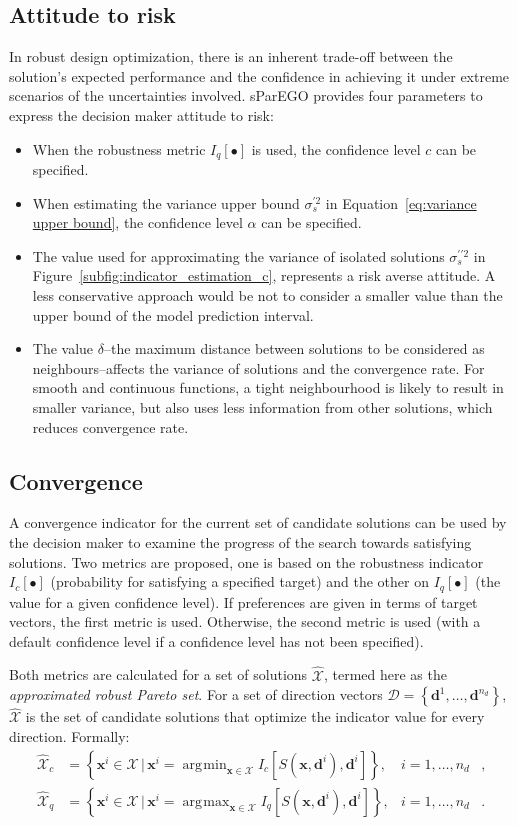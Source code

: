 \documentclass[10pt]{llncs}
\newcommand{\brr}[1]{{\left({#1}\right)}} %
\newcommand{\brf}[1]{\left\lbrace{#1}\right\rbrace} %
\newcommand{\Iq}[1]{\ensuremath{I_q\!\left[{#1}\right]}} %
\newcommand{\Ic}[1]{\ensuremath{I_c\!\left[{#1}\right]}} %
\newcommand{\vx}{\ensuremath{\mathbf{x}}} %
\newcommand{\vd}{\ensuremath{\mathbf{d}}} %
\newcommand{\DSet}{\ensuremath{\mathcal{D}}} %
\newcommand{\XSet}{\ensuremath{\mathcal{X}}} %
\DeclareMathOperator*{\argmin}{\arg\!\min}
\DeclareMathOperator*{\argmax}{\arg\!\max}
\begin{document}
\subsection{Attitude to risk}
\label{subsec:risk}
In robust design optimization, there is an inherent trade-off between the solution's expected performance and the confidence in achieving it under extreme scenarios of the uncertainties involved. sParEGO provides four parameters to express the decision maker attitude to risk:
\begin{itemize}
	\item When the robustness metric $\Iq{\bullet}$ is used, the confidence level $c$ can be specified.
	\item When estimating the variance upper bound $\sigma^{\prime 2}_s$  in Equation~\eqref{eq:variance upper bound}, the confidence level $\alpha$ can be specified.
	\item The value used for approximating the variance of isolated solutions $\sigma^{\prime\prime 2}_s$ in Figure~\ref{subfig:indicator_estimation_c}, represents a risk averse attitude. A less conservative approach would be not to consider a smaller value than the upper bound of the model prediction interval.
	\item The value $\delta$--the maximum distance between solutions to be considered as neighbours--affects the variance of solutions and the convergence rate.
		For smooth and continuous functions, a tight neighbourhood is likely to result in smaller variance, but also uses less information from other solutions, which reduces convergence rate.
\end{itemize}

\subsection{Convergence}
\label{subsec:convergence}
A convergence indicator for the current set of candidate solutions can be used by the decision maker to examine the progress of the search towards satisfying solutions. Two metrics are proposed, one is based on the robustness indicator $\Ic{\bullet}$ (probability for satisfying a specified target) and the other on $\Iq{\bullet}$ (the value for a given confidence level). If preferences are given in terms of target vectors, the first metric is used. Otherwise, the second metric is used (with a default confidence level if a confidence level has not been specified).

Both metrics are calculated for a set of solutions $\hat{\XSet}$, termed here as the \textit{approximated robust Pareto set}. For a set of direction vectors $\DSet = \brf{\vd^1,\ldots,\vd^{n_d}}$, $\hat{\XSet}$ is the set of candidate solutions that optimize the indicator value for every direction. Formally:
\begin{align}
	\label{eq:Xc} \hat{\XSet}_c &= \brf{\vx^i\in \XSet \,\vert\, \vx^i = \argmin_{\vx\in\XSet} \Ic{S\brr{\vx,\vd^i},\vd^i} }, &i=1,\ldots,n_d&,\\ 
	\label{eq:Xq} \hat{\XSet}_q &= \brf{\vx^i\in \XSet \,\vert\, \vx^i = \argmax_{\vx\in\XSet} \Iq{S\brr{\vx,\vd^i},\vd^i} }, &i=1,\ldots,n_d&.
\end{align}
\end{document}

